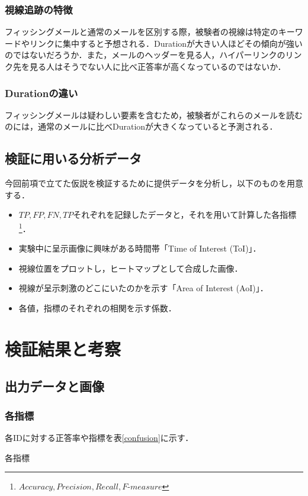 \documentclass[a4paper,11pt]{ltjsreport}
\begin{document}
\subsection{視線追跡の特徴}
フィッシングメールと通常のメールを区別する際，被験者の視線は特定のキーワードやリンクに集中すると予想される．Durationが大きい人ほどその傾向が強いのではないだろうか．また，メールのヘッダーを見る人，ハイパーリンクのリンク先を見る人はそうでない人に比べ正答率が高くなっているのではないか．

\subsection{Durationの違い}
フィッシングメールは疑わしい要素を含むため，被験者がこれらのメールを読むのには，通常のメールに比べDurationが大きくなっていると予測される．

\section{検証に用いる分析データ}
今回前項で立てた仮説を検証するために提供データを分析し，以下のものを用意する．
\begin{itemize}
	\item $TP, FP, FN, TP$それぞれを記録したデータと，それを用いて計算した各指標\footnote{$Accuracy, Precision, Recall, F\textrm{-}measure$}．
	\item 実験中に呈示画像に興味がある時間帯「Time of Interest (ToI)」．
	\item 視線位置をプロットし，ヒートマップとして合成した画像．
	\item 視線が呈示刺激のどこにいたのかを示す「Area of Interest (AoI)」．
	\item 各値，指標のそれぞれの相関を示す係数．
\end{itemize}

\chapter{検証結果と考察}
\section{出力データと画像}
\subsection{各指標}
各IDに対する正答率や指標を表\ref{confusion}に示す．
\begin{table}[H]
	\centering
	\caption{各指標\label{confusion}}
\end{table}
\end{document}
